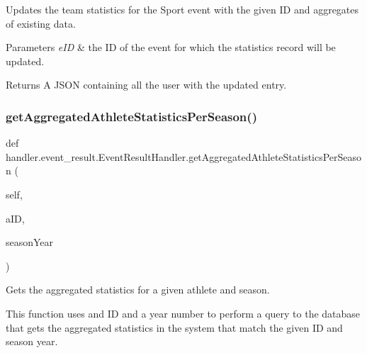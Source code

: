 Updates the team statistics for the Sport event with the given ID and aggregates of existing data. 


\begin{DoxyParams}{Parameters}
{\em e\+ID} & the ID of the event for which the statistics record will be updated.\\
\hline
\end{DoxyParams}
\begin{DoxyReturn}{Returns}
A J\+S\+ON containing all the user with the updated entry. 
\end{DoxyReturn}
\mbox{\label{classhandler_1_1event__result_1_1_event_result_handler_a946c8456032be93aad1fd2c8e804ebec}} 
\subsubsection{\texorpdfstring{get\+Aggregated\+Athlete\+Statistics\+Per\+Season()}{getAggregatedAthleteStatisticsPerSeason()}}
{\footnotesize\ttfamily def handler.\+event\+\_\+result.\+Event\+Result\+Handler.\+get\+Aggregated\+Athlete\+Statistics\+Per\+Season (\begin{DoxyParamCaption}\item[{}]{self,  }\item[{}]{a\+ID,  }\item[{}]{season\+Year }\end{DoxyParamCaption})}



Gets the aggregated statistics for a given athlete and season. 

This function uses and ID and a year number to perform a query to the database that gets the aggregated statistics in the system that match the given ID and season year.


